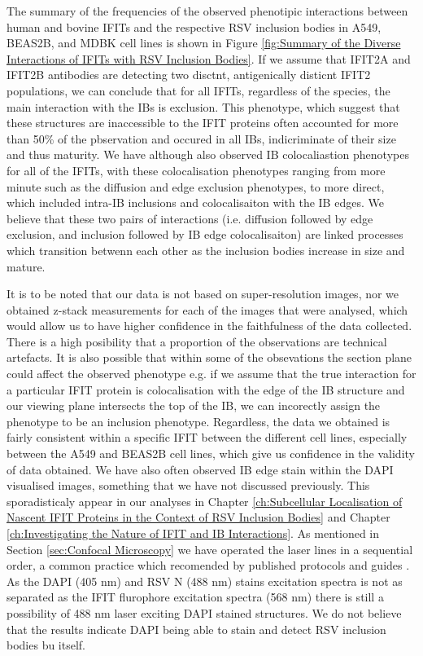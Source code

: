 The summary of the frequencies of the observed phenotipic interactions between human and bovine IFITs and the respective RSV inclusion bodies in A549, BEAS2B, and MDBK cell lines is shown in Figure \ref{fig:Summary of the Diverse Interactions of IFITs with RSV Inclusion Bodies}. If we assume that IFIT2A and IFIT2B antibodies are detecting two disctnt, antigenically disticnt IFIT2 populations, we can conclude that for all IFITs, regardless of the species, the main interaction with the IBs is exclusion. This phenotype, which suggest that these structures are inaccessible to the IFIT proteins often accounted for more than 50\% of the pbservation and occured in all IBs, indicriminate of their size and thus maturity. We have although also observed IB colocaliastion phenotypes for all of the IFITs, with these colocalisation phenotypes ranging from more minute such as the diffusion and edge exclusion phenotypes, to more direct, which included intra-IB inclusions and colocalisaiton with the IB edges. We believe that these two pairs of interactions (i.e. diffusion followed by edge exclusion, and inclusion followed by IB edge colocalisaiton) are linked processes which transition betwenn each other as the inclusion bodies increase in size and mature. 

It is to be noted that our data is not based on super-resolution images, nor we obtained z-stack measurements for each of the images that were analysed, which would allow us to have higher confidence in the faithfulness of the data collected. There is a high posibility that a proportion of the observations are technical artefacts. It is also possible that within some of the obsevations the section plane could affect the observed phenotype e.g. if we assume that the true interaction for a particular IFIT protein is colocalisation with the edge of the IB structure and our viewing plane intersects the top of the IB, we can incorectly assign the phenotype to be an inclusion phenotype. Regardless, the data we obtained is fairly consistent within a specific IFIT between the different cell lines, especially between the A549 and BEAS2B cell lines, which give us confidence in the validity of data obtained. We have also often observed IB edge stain within the DAPI visualised images, something that we have not discussed previously. This sporadisticaly appear in our analyses in Chapter \ref{ch:Subcellular Localisation of Nascent IFIT Proteins in the Context of RSV Inclusion Bodies} and Chapter \ref{ch:Investigating the Nature of IFIT and IB Interactions}. As mentioned in Section \ref{sec:Confocal Microscopy} we have operated the laser lines in a sequential order, a common practice which recomended by published protocols and guides \cite{Jonkman2020Tutorial:Microscopy}. As the DAPI (405 nm) and RSV N (488 nm) stains excitation spectra is not as separated as the IFIT flurophore excitation spectra (568 nm) there is still a possibility of 488 nm laser exciting DAPI stained structures. We do not believe that the results indicate DAPI being able to stain and detect RSV inclusion bodies bu itself.

